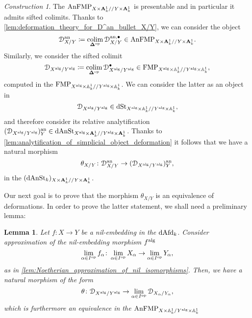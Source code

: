 \documentclass[10pt,a4paper,reqno]{amsart} %
\theoremstyle{plain}
\newtheorem{lem}[thm]{Lemma}
\theoremstyle{definition}
\theoremstyle{remark}
\numberwithin{equation}{section}
\newtheorem{construction}[thm]{Construction}
\begin{document}
\begin{construction}
    The \infcat $\mathrm{AnFMP}_{X\times\mathbf A^1_k/ /Y\times\mathbf A^1_k}$ is presentable and in particular it
    admits sifted colimits. Thanks to \cref{lem:deformation_theory_for_D^an_bullet_X/Y},
    we can consider the object
        \[
            \mathcal D^\mathrm{an}_{X/Y} \coloneqq \operatorname*{colim}_{\bm{\Delta} ^\mathrm{op}} \mathcal D^{\mathrm{an}, \bullet}_{X/Y} \in \mathrm{AnFMP}_{X\times\mathbf A^1_k/ /Y\times\mathbf A^1_k}.  
        \]
    Similarly, we consider the sifted colimit
        \[
            \mathcal D_{X^\mathrm{alg}/ Y^\mathrm{alg}} \coloneqq \operatorname*{colim}_{\bm{\Delta} ^\mathrm{op}} \mathcal D^\bullet_{X^\mathrm{alg}/ Y^\mathrm{alg}} \in \mathrm{FMP}_{X^\mathrm{alg} \times \mathbb A^1_k/ /Y^\mathrm{alg} \times \mathbb A^1_k} ,
        \]
    computed in the \infcat $\mathrm{FMP}_{X^\mathrm{alg}\times\mathbb A^1_k/ /Y^\mathrm{alg}\times\mathbb A^1_k}$. We can consider the latter as an object in
        \[
            \mathcal D_{X^\mathrm{alg}/ Y^\mathrm{alg}} \in \mathrm{dSt}_{X^\mathrm{alg} \times \mathbb A^1_k/ /Y^\mathrm{alg} \times \mathbb A^1_k},  
        \]
    and therefore consider its relative analytification $(\mathcal D_{X^\mathrm{alg}/ Y^\mathrm{alg}})^\mathrm{an}_Y \in \mathrm{dAnSt}_{X^\mathrm{alg} \times \mathbf A^1_k/ /Y^\mathrm{alg} \times \mathbf A^1_k}$. Thanks to
    \cref{lem:analytification_of_simplicial_object_deformation} it follows that we have a natural morphism
        \[
            \theta_{X/ Y} \colon \mathcal D^\mathrm{an}_{X/ Y} \to (\mathcal D_{X^\mathrm{alg}/ Y^\mathrm{alg}})^\mathrm{an}_Y,  
        \]
    in the \infcat $(\mathrm{dAnSt}_k)_{X \times \mathbf A^1_k/ /Y \times \mathbf A^1_k}$.
\end{construction}

Our next goal is to prove that the morphism $\theta_{X/ Y}$ is an equivalence of deformations. In order to prove the latter statement, we shall
need a preliminary lemma:

\begin{lem} \label{lem:Noetherian_approximation_of_the_deformation_to_the_normal_bundle}
    Let $f \colon X \to Y$ be a nil-embedding in the \infcat $\mathrm{dAfd}_k$. Consider approximation of the nil-embedding morphism $f^\mathrm{alg}$
        \[
            \lim_{\alpha \in I^\mathrm{op}} f_\alpha \colon \lim_{\alpha \in I^\mathrm{op}} X_\alpha \to \lim_{\alpha \in I^\mathrm{op}} Y_\alpha,
        \]
    as in \cref{lem:Noetherian_approximation_of_nil_isomorphisms}. Then, we have a natural morphism of the form
        \begin{equation} \label{eq:morphism_theta}
            \theta \colon \mathcal D_{X^\mathrm{alg}/ Y^\mathrm{alg}}  \to \lim_{\alpha \in I^\mathrm{op}} \mathcal D_{X_\alpha/ Y_\alpha},
        \end{equation}
    which is furthermore an equivalence in the \infcat $\mathrm{AnFMP}_{X \times \mathbb A^1_k / Y ^\mathrm{alg} \times \mathbb A^1_k}$
\end{lem}
\end{document}
